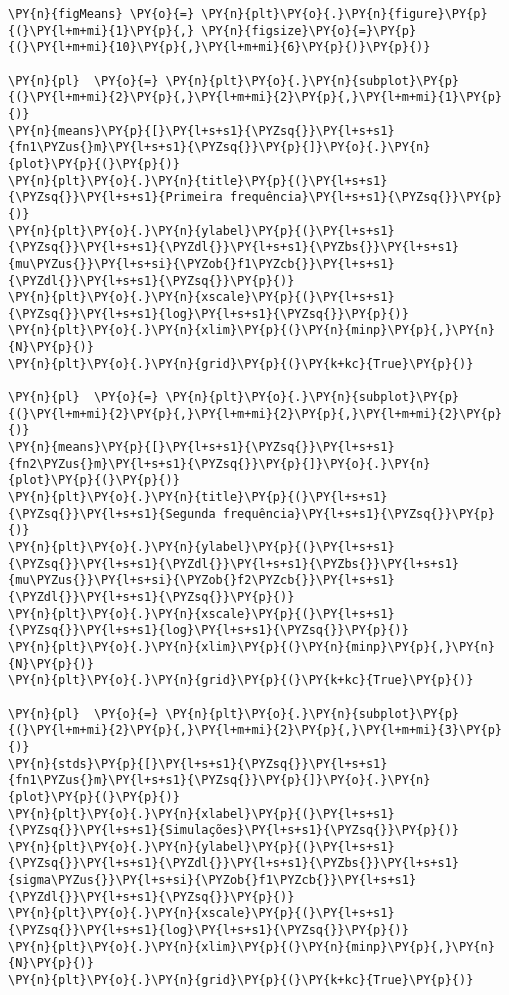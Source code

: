     \begin{tcolorbox}[breakable, size=fbox, boxrule=1pt, pad at break*=1mm,colback=cellbackground, colframe=cellborder]
\begin{Verbatim}[commandchars=\\\{\}]
\PY{n}{figMeans} \PY{o}{=} \PY{n}{plt}\PY{o}{.}\PY{n}{figure}\PY{p}{(}\PY{l+m+mi}{1}\PY{p}{,} \PY{n}{figsize}\PY{o}{=}\PY{p}{(}\PY{l+m+mi}{10}\PY{p}{,}\PY{l+m+mi}{6}\PY{p}{)}\PY{p}{)}

\PY{n}{pl}  \PY{o}{=} \PY{n}{plt}\PY{o}{.}\PY{n}{subplot}\PY{p}{(}\PY{l+m+mi}{2}\PY{p}{,}\PY{l+m+mi}{2}\PY{p}{,}\PY{l+m+mi}{1}\PY{p}{)}
\PY{n}{means}\PY{p}{[}\PY{l+s+s1}{\PYZsq{}}\PY{l+s+s1}{fn1\PYZus{}m}\PY{l+s+s1}{\PYZsq{}}\PY{p}{]}\PY{o}{.}\PY{n}{plot}\PY{p}{(}\PY{p}{)}
\PY{n}{plt}\PY{o}{.}\PY{n}{title}\PY{p}{(}\PY{l+s+s1}{\PYZsq{}}\PY{l+s+s1}{Primeira frequência}\PY{l+s+s1}{\PYZsq{}}\PY{p}{)}
\PY{n}{plt}\PY{o}{.}\PY{n}{ylabel}\PY{p}{(}\PY{l+s+s1}{\PYZsq{}}\PY{l+s+s1}{\PYZdl{}}\PY{l+s+s1}{\PYZbs{}}\PY{l+s+s1}{mu\PYZus{}}\PY{l+s+si}{\PYZob{}f1\PYZcb{}}\PY{l+s+s1}{\PYZdl{}}\PY{l+s+s1}{\PYZsq{}}\PY{p}{)}
\PY{n}{plt}\PY{o}{.}\PY{n}{xscale}\PY{p}{(}\PY{l+s+s1}{\PYZsq{}}\PY{l+s+s1}{log}\PY{l+s+s1}{\PYZsq{}}\PY{p}{)}
\PY{n}{plt}\PY{o}{.}\PY{n}{xlim}\PY{p}{(}\PY{n}{minp}\PY{p}{,}\PY{n}{N}\PY{p}{)}
\PY{n}{plt}\PY{o}{.}\PY{n}{grid}\PY{p}{(}\PY{k+kc}{True}\PY{p}{)}

\PY{n}{pl}  \PY{o}{=} \PY{n}{plt}\PY{o}{.}\PY{n}{subplot}\PY{p}{(}\PY{l+m+mi}{2}\PY{p}{,}\PY{l+m+mi}{2}\PY{p}{,}\PY{l+m+mi}{2}\PY{p}{)}
\PY{n}{means}\PY{p}{[}\PY{l+s+s1}{\PYZsq{}}\PY{l+s+s1}{fn2\PYZus{}m}\PY{l+s+s1}{\PYZsq{}}\PY{p}{]}\PY{o}{.}\PY{n}{plot}\PY{p}{(}\PY{p}{)}
\PY{n}{plt}\PY{o}{.}\PY{n}{title}\PY{p}{(}\PY{l+s+s1}{\PYZsq{}}\PY{l+s+s1}{Segunda frequência}\PY{l+s+s1}{\PYZsq{}}\PY{p}{)}
\PY{n}{plt}\PY{o}{.}\PY{n}{ylabel}\PY{p}{(}\PY{l+s+s1}{\PYZsq{}}\PY{l+s+s1}{\PYZdl{}}\PY{l+s+s1}{\PYZbs{}}\PY{l+s+s1}{mu\PYZus{}}\PY{l+s+si}{\PYZob{}f2\PYZcb{}}\PY{l+s+s1}{\PYZdl{}}\PY{l+s+s1}{\PYZsq{}}\PY{p}{)}
\PY{n}{plt}\PY{o}{.}\PY{n}{xscale}\PY{p}{(}\PY{l+s+s1}{\PYZsq{}}\PY{l+s+s1}{log}\PY{l+s+s1}{\PYZsq{}}\PY{p}{)}
\PY{n}{plt}\PY{o}{.}\PY{n}{xlim}\PY{p}{(}\PY{n}{minp}\PY{p}{,}\PY{n}{N}\PY{p}{)}
\PY{n}{plt}\PY{o}{.}\PY{n}{grid}\PY{p}{(}\PY{k+kc}{True}\PY{p}{)}

\PY{n}{pl}  \PY{o}{=} \PY{n}{plt}\PY{o}{.}\PY{n}{subplot}\PY{p}{(}\PY{l+m+mi}{2}\PY{p}{,}\PY{l+m+mi}{2}\PY{p}{,}\PY{l+m+mi}{3}\PY{p}{)}
\PY{n}{stds}\PY{p}{[}\PY{l+s+s1}{\PYZsq{}}\PY{l+s+s1}{fn1\PYZus{}m}\PY{l+s+s1}{\PYZsq{}}\PY{p}{]}\PY{o}{.}\PY{n}{plot}\PY{p}{(}\PY{p}{)}
\PY{n}{plt}\PY{o}{.}\PY{n}{xlabel}\PY{p}{(}\PY{l+s+s1}{\PYZsq{}}\PY{l+s+s1}{Simulações}\PY{l+s+s1}{\PYZsq{}}\PY{p}{)}
\PY{n}{plt}\PY{o}{.}\PY{n}{ylabel}\PY{p}{(}\PY{l+s+s1}{\PYZsq{}}\PY{l+s+s1}{\PYZdl{}}\PY{l+s+s1}{\PYZbs{}}\PY{l+s+s1}{sigma\PYZus{}}\PY{l+s+si}{\PYZob{}f1\PYZcb{}}\PY{l+s+s1}{\PYZdl{}}\PY{l+s+s1}{\PYZsq{}}\PY{p}{)}
\PY{n}{plt}\PY{o}{.}\PY{n}{xscale}\PY{p}{(}\PY{l+s+s1}{\PYZsq{}}\PY{l+s+s1}{log}\PY{l+s+s1}{\PYZsq{}}\PY{p}{)}
\PY{n}{plt}\PY{o}{.}\PY{n}{xlim}\PY{p}{(}\PY{n}{minp}\PY{p}{,}\PY{n}{N}\PY{p}{)}
\PY{n}{plt}\PY{o}{.}\PY{n}{grid}\PY{p}{(}\PY{k+kc}{True}\PY{p}{)}


\end{Verbatim}
\end{tcolorbox}
